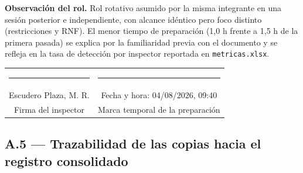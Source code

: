 \documentclass[11pt,letterpaper]{article}
\makeatletter
\newcommand{\firma}[2]{%
\vspace{0.5cm}
\begin{center}
\begin{tabular}{c@{\hspace{2.5cm}}c}
\rule{6cm}{0.4pt} & \rule{5cm}{0.4pt}\\
{\small #1} & {\small Fecha y hora: #2}\\
{\small Firma del inspector} & {\small Marca temporal de la preparación}\\
\end{tabular}
\end{center}}
\makeatother
\begin{document}
\small \textbf{Observación del rol.} Rol rotativo asumido por la misma integrante en una
sesión posterior e independiente, con alcance idéntico pero foco distinto (restricciones y
RNF). El menor tiempo de preparación (1,0 h frente a 1,5 h de la primera pasada) se explica
por la familiaridad previa con el documento y se refleja en la tasa de detección por
inspector reportada en \texttt{metricas.xlsx}.
\normalsize

\firma{Escudero Plaza, M. R.}{04/08/2026, 09:40}

\clearpage

\subsection*{A.5 --- Trazabilidad de las copias hacia el registro consolidado}
\end{document}
